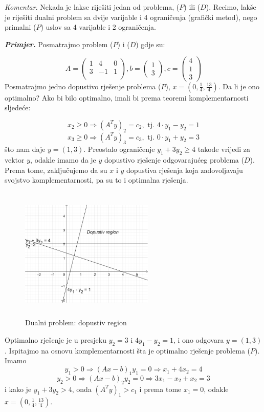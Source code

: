 \documentclass[a4paper, utf8, 11pt, colorlinks]{book}
\begin{document}
\emph{Komentar}.  Nekada je lakse riješiti jedan od problema, ($P$)  ili  ($D$).  Recimo, lakše je riješiti dualni problem sa dvije varijable i 4 ograničenja (grafički metod), nego primalni  ($P$)  uslov sa 4 varijable i 2 ograničenja. 

\emph{\textbf{Primjer.}} Posmatrajmo problem  ($P$)  i  ($D$)  gdje su:
 
$$      A = \left(\begin{array}{ccc}
          1 &  4 & 0 \\
          3 & -1 & 1 \\
      \end{array} \right ), b = \left (\begin{array}{c}
           1 \\
           3
      \end{array}\right ), c =\left ( \begin{array}{c}
           4  \\
           1  \\
           3
      \end{array} \right )
 $$
Posmatrajmo jedno dopustivo rješenje problema  ($P$), $x = (0, \frac{1}{4}, \frac{13}{4})$. Da li je ono optimalno? Ako bi bilo optimalno, imali bi prema teoremi komplementarnosti sljedeće:

$$x_2 \geq 0 \Rightarrow  (A^T y)_2  = c_2, \mbox{ tj. } 4 \cdot y_1 - y_2 = 1$$
$$x_3 \geq 0 \Rightarrow  (A^T y)_3  = c_3, \mbox{ tj. } 0 \cdot y_1 + y_2 = 3$$
što nam daje  $y = (1, 3)$. Preostalo ograničenje $y_1 + 3 y_2 \geq 4$ takođe vrijedi za vektor $y$, odakle imamo da je $y$ dopustivo rješenje odgovarajućeg problema  ($D$).  Prema tome, zaključujemo da su $x$ i $y$ dopustiva rješenja koja zadovoljavaju svojstvo komplementarnosti, pa su to i optimalna rješenja. 

\begin{figure}[!ht]
    \centering
     \includegraphics[width=180pt, height=180pt]{fig5.eps}
    \caption{Dualni problem: dopustiv region}
    \label{fig:fig5}
\end{figure}
Optimalno rješenje je u presjeku $y_2 = 3$ i $4y_1 - y_2 = 1$, i ono odgovara $y = (1, 3)$. Ispitajmo na osnovu komplementarnosti šta je optimalno rješenje problema ($P$). Imamo 
$$y_1 > 0 \Rightarrow (Ax - b)_1 y_1 = 0 \Rightarrow x_1 + 4 x_2 = 4 $$
$$y_2 > 0 \Rightarrow (Ax - b)_2 y_2 = 0 \Rightarrow 3x_1 - x_2 + x_2 = 3 $$
i kako je $y_1 + 3 y_2 > 4$, onda $(A^Ty)_1 > c_1$ i prema tome $x_1 =0$, 
odakle $x =(0, \frac{1}{4}, \frac{13}{4})$. 
\end{document}
